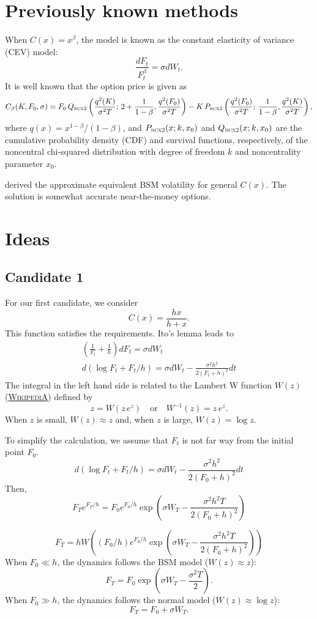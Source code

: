 \documentclass[authoryear,reqno,12pt,a4paper]{elsarticle}
\newcommand{\ncx}{\textsc{ncx2}}
\newcommand{\qtext}[2][\quad]{#1\text{#2}#1}
\newcommand{\citewiki}[1]{(\href{https://en.wikipedia.org/wiki/#1}{\textmd{\textsc{WikipediA}}})}
\begin{document}
\section{Previously known methods}
When $C(x)=x^\beta$, the model is known as the constant elasticity of variance (CEV) model:
$$ \frac{d F_t}{F_t^\beta} = \sigma dW_t. $$
It is well known that the option price is given as
$$ C_\beta(K,F_0,\sigma) = F_0 \, Q_\ncx\left(\frac{q^2(K)}{\sigma^2 T}; \,2+\frac1{1-\beta},\frac{q^2(F_0)}{\sigma^2 T}\right) - K \, P_\ncx\left(\frac{q^2(F_0)}{\sigma^2 T};\, \frac1{1-\beta},\frac{q^2(K)}{\sigma^2 T}\right),
$$
where $q(x) = x^{1-\beta}/(1-\beta)$, and $P_\ncx(x;k, x_0)$ and $Q_\ncx(x;k,x_0)$ are the cumulative probability density (CDF) and survival functions, respectively, of the noncentral chi-squared distribution with degree of freedom $k$ and noncentrality parameter $x_0$.

\citet{hagan1999equiv} derived the approximate equivalent BSM volatility for general $C(x)$. The solution is somewhat accurate near-the-money options.


\section{Ideas}
\subsection{Candidate 1}
For our first candidate, we consider 
$$C(x) = \frac{hx}{h+x}.$$ 
This function satisfies the requirements.
Ito's lemma leads to
\begin{gather*}
\left(\frac1{F_t}+\frac{1}{h}\right) dF_t = \sigma dW_t \\
d (\log F_t + F_t/h) = \sigma dW_t - \frac{\sigma^2 h^2}{2(F_t+h)^2}dt
\end{gather*}
The integral in the left hand side is related to the Lambert W function $W(z)$  \citewiki{Lambert_W_function} defined by 
$$ z = W(z\,e^z) \qtext{or}  W^{-1}(z) = z\,e^{z}. $$
When $z$ is small, $W(z)\approx z$ and, when $z$ is large, $W(z)=\log z$.

To simplify the calculation, we assume that $F_t$ is not far way from the initial point $F_0$. 
$$ d (\log F_t + F_t/h) = \sigma dW_t - \frac{\sigma^2 h^2}{2(F_0+h)^2}dt
$$
Then,
$$ F_T e^{F_T/h} = F_0 e^{F_0/h} \exp\left(\sigma W_T - \frac{\sigma^2 h^2T}{2(F_0+h)^2} \right)
$$

$$ F_T = h W\left( (F_0/h) e^{F_0/h} \exp\left( \sigma W_T - \frac{\sigma^2 h^2 T}{2(F_0+h)^2} \right)\right)
$$
When $F_0 \ll h$, the dynamics follows the BSM model ($W(z)\approx z$):
$$ F_T = F_0 \exp\left( \sigma W_T - \frac{\sigma^2 T}{2} \right).
$$
When $F_0 \gg h$, the dynamics follows the normal model ($W(z)\approx \log z$):
$$ F_T = F_0 + \sigma W_T.
$$
\end{document}
